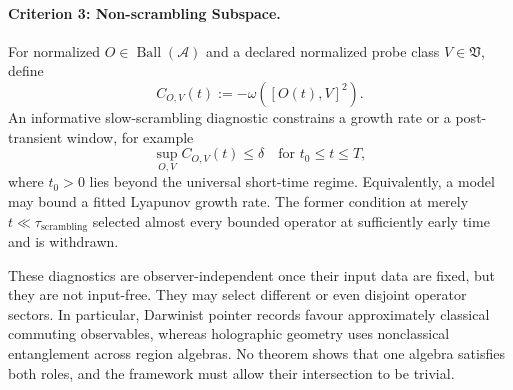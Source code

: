 \documentclass[12pt,a4paper]{article}
\begin{document}
\paragraph{Criterion 3: Non-scrambling Subspace.}
For normalized $O\in\operatorname{Ball}(\mathcal A)$ and a declared normalized probe class $V\in\mathfrak V$, define
\begin{equation}
C_{O,V}(t):=-\omega\!\left([O(t),V]^2\right).
\end{equation}
An informative slow-scrambling diagnostic constrains a growth rate or a post-transient window, for example
\begin{equation}
\sup_{O,V} C_{O,V}(t)\le\delta
\quad\text{for }t_0\le t\le T,
\end{equation}
where $t_0>0$ lies beyond the universal short-time regime.  Equivalently, a model may bound a fitted Lyapunov growth rate.  The former condition at merely $t\ll\tau_{\mathrm{scrambling}}$ selected almost every bounded operator at sufficiently early time and is withdrawn.

These diagnostics are observer-independent once their input data are fixed, but they are not input-free.  They may select different or even disjoint operator sectors.  In particular, Darwinist pointer records favour approximately classical commuting observables, whereas holographic geometry uses nonclassical entanglement across region algebras.  No theorem shows that one algebra satisfies both roles, and the framework must allow their intersection to be trivial.
\end{document}
